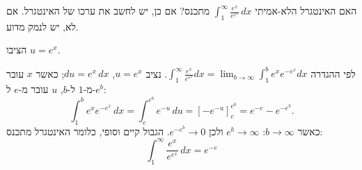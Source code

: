 
\begin{question}
האם האינטגרל הלא-אמיתי $\displaystyle\int_1^\infty\frac{e^x}{e^{e^x}}\,dx$ מתכנס? אם כן, יש לחשב את ערכו של האינטגרל. אם לא, יש לנמק מדוע.
\end{question}

\begin{hint}
הציבו $u=e^x$.
\end{hint}

\begin{solution}
לפי ההגדרה $\int_1^\infty\frac{e^x}{e^{e^x}}dx=\lim_{b\to\infty}\int_1^b e^xe^{-e^x}dx$. נציב $u=e^x$, $du=e^x\,dx$; כאשר $x$ עובר מ-$1$ ל-$b$, $u$ עובר מ-$e$ ל-$e^b$:
\[ \int_1^b e^xe^{-e^x}\,dx=\int_e^{e^b}e^{-u}\,du=\left[-e^{-u}\right]_e^{e^b}=e^{-e}-e^{-e^b}. \]
כאשר $b\to\infty$: $e^b\to\infty$ ולכן $e^{-e^b}\to0$. הגבול קיים וסופי, כלומר האינטגרל מתכנס:
\[ \boxed{\int_1^\infty\frac{e^x}{e^{e^x}}\,dx=e^{-e}} \]
\end{solution}
